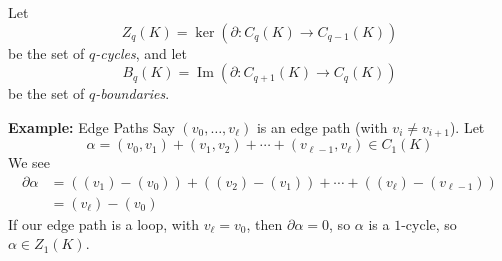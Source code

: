 \begin{definition}
    Let
    \[ Z_q(K) = \ker(\partial : C_q(K) \to C_{q - 1}(K)) \]
    be the set of \emph{$q$-cycles}, and let
    \[ B_q(K) = \operatorname{Im}(\partial : C_{q + 1}(K) \to C_q(K)) \]
    be the set of \emph{$q$-boundaries}.
\end{definition}

\begin{example}{\textbf{Example:} Edge Paths}
    Say $(v_0, \ldots, v_{\ell})$ is an edge path (with $v_i \neq v_{i + 1}$). Let
    \[ \alpha = (v_0, v_1) + (v_1, v_2) + \cdots + (v_{\ell - 1}, v_{\ell}) \in C_1(K) \]
    We see
    \begin{align*}
        \partial\alpha &= ((v_1) - (v_0)) + ((v_2) - (v_1)) + \cdots + ((v_{\ell}) - (v_{\ell - 1}))\\
        &= (v_{\ell}) - (v_0)
    \end{align*}
    If our edge path is a loop, with $v_{\ell} = v_0$, then $\partial\alpha = 0$, so $\alpha$ is a $1$-cycle, so $\alpha \in Z_1(K)$.
\end{example}
